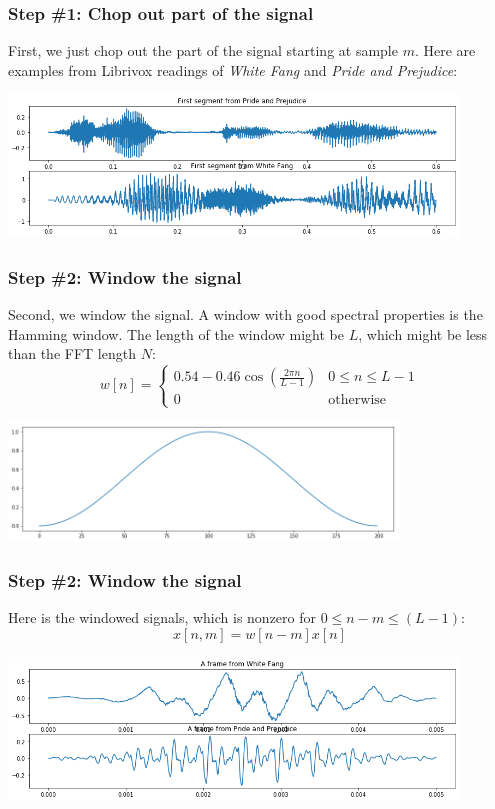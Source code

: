 \documentclass{beamer}
\begin{document}
\begin{frame}
  \frametitle{Step \#1: Chop out part of the signal}

  First, we just chop out the part of the signal starting at sample
  $m$.  Here are examples from Librivox readings of {\em White Fang}
  and {\em Pride and Prejudice}:
  \centerline{\includegraphics[height=1.5in]{librivox_waves.png}}
\end{frame}

\begin{frame}
  \frametitle{Step \#2: Window the signal}

  Second, we window the signal.  A window with good spectral
  properties is the Hamming window.  The length of the window might be
  $L$, which might be less than the FFT length $N$:
  \[
  w[n] = \begin{cases}
    0.54 - 0.46\cos\left(\frac{2\pi n}{L-1}\right) & 0\le n\le L-1\\
    0 & \mbox{otherwise}
    \end{cases}
  \]
  \centerline{\includegraphics[height=1.25in]{hamming.png}}
\end{frame}

\begin{frame}
  \frametitle{Step \#2: Window the signal}

  Here is the windowed signals, which is nonzero for $0\le n-m\le (L-1)$:
  \[
  x[n,m] = w[n-m]x[n]
  \]
  \centerline{\includegraphics[height=1.5in]{librivox_windowed.png}}
\end{frame}
\end{document}
